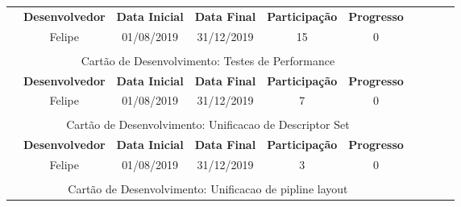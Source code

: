\documentclass[ a4paper, landscape]{article}
\begin{document}
\begin{longtable}{p{0.1cm}c|c|c|c|c|c|c|cp{0.1cm}}
      &\multicolumn{1}{|c|}{\textbf{\textcolor{CDes}{Desenvolvedor}}} 
      &\textbf{\textcolor{CDes}{Data Inicial}} 
      &\textbf{\textcolor{CDes}{Data Final}} 
      &\textbf{\textcolor{CDes}{Participação}} 
      &\multicolumn{1}{c|}{\textbf{\textcolor{CDes}{Progresso}}} \\ [1ex] \cline{2-6} 
      &\multicolumn{1}{|c|}{\textcolor{CDes}{Felipe}}
      &\textcolor{CDes}{01/08/2019}
      &\textcolor{CDes}{31/12/2019}
      &\textcolor{CDes}{15}
      &\multicolumn{1}{c|}{\textcolor{CDes}{0}}\\ [1ex] 
      \cline{2-6}\\ 
    \multicolumn{6}{c}{ \textcolor{CDes}{ Cartão de Desenvolvimento: Testes de Performance}}\\ 
     \cline{2-6} 
      
      &\multicolumn{1}{|c|}{\textbf{\textcolor{CDes}{Desenvolvedor}}} 
      &\textbf{\textcolor{CDes}{Data Inicial}} 
      &\textbf{\textcolor{CDes}{Data Final}} 
      &\textbf{\textcolor{CDes}{Participação}} 
      &\multicolumn{1}{c|}{\textbf{\textcolor{CDes}{Progresso}}} \\ [1ex] \cline{2-6} 
      &\multicolumn{1}{|c|}{\textcolor{CDes}{Felipe}}
      &\textcolor{CDes}{01/08/2019}
      &\textcolor{CDes}{31/12/2019}
      &\textcolor{CDes}{7}
      &\multicolumn{1}{c|}{\textcolor{CDes}{0}}\\ [1ex] 
      \cline{2-6}\\ 
    \multicolumn{6}{c}{ \textcolor{CDes}{ Cartão de Desenvolvimento: Unificacao de Descriptor Set}}\\ 
     \cline{2-6} 
      
      &\multicolumn{1}{|c|}{\textbf{\textcolor{CDes}{Desenvolvedor}}} 
      &\textbf{\textcolor{CDes}{Data Inicial}} 
      &\textbf{\textcolor{CDes}{Data Final}} 
      &\textbf{\textcolor{CDes}{Participação}} 
      &\multicolumn{1}{c|}{\textbf{\textcolor{CDes}{Progresso}}} \\ [1ex] \cline{2-6} 
      &\multicolumn{1}{|c|}{\textcolor{CDes}{Felipe}}
      &\textcolor{CDes}{01/08/2019}
      &\textcolor{CDes}{31/12/2019}
      &\textcolor{CDes}{3}
      &\multicolumn{1}{c|}{\textcolor{CDes}{0}}\\ [1ex] 
      \cline{2-6}\\ 
    \multicolumn{6}{c}{ \textcolor{CDes}{ Cartão de Desenvolvimento: Unificacao de pipline layout}}\\ 
     \cline{2-6} 
      

\end{longtable}
\end{document}
